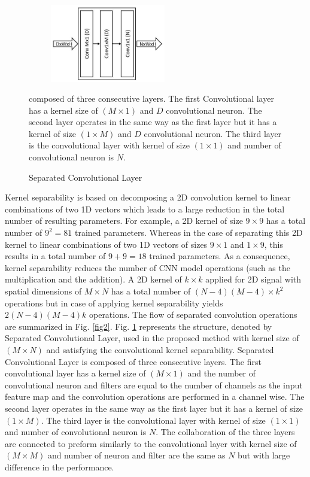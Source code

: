 \begin{figure}
\begin{center}
\includegraphics[height=34mm,width=7.0cm]{Figures/fig3.jpg}
\caption{Separated Convolutional Layer}{ composed of three consecutive layers. The first Convolutional layer has a kernel size of $(M\times1)$ and $D$  convolutional neuron. The second layer  operates in the same way as the first layer but it has a kernel of size $(1\times M)$ and $D$ convolutional neuron. The third layer is the convolutional layer with kernel of size $(1\times1)$ and number of convolutional neuron is $N$.}
\label{fig3}
\end{center}

\end{figure}
    
Kernel separability\cite{rigamonti2013learning} \cite{szegedy2017inception} is based on decomposing a 2D convolution kernel to  linear combinations of two 1D vectors which leads to a large reduction in  the total number of resulting parameters. For example, a 2D kernel of size $9 \times 9$ has a total number of $9^2 = 81$  trained parameters. Whereas in the case of separating this 2D kernel to  linear combinations of two 1D vectors of sizes $9 \times 1$ and $1 \times 9$, this results in a total number of  $9 + 9 = 18$ trained parameters. As a consequence, kernel separability reduces the number of  CNN model operations (such as the multiplication and the addition). A  2D kernel of $k \times k$ applied for 2D signal with spatial dimensions of $ M \times N$ has a total number of  $(N-4)(M-4)\times k^2$ operations but in case of  applying kernel separability  yields $2(N-4)(M-4)k$ operations. The flow of separated convolution operations are summarized in Fig. \ref{fig2}. Fig. \ref{fig3} represents the structure, denoted by Separated Convolutional Layer, used in the proposed method with kernel size of $(M\times N)$ and satisfying the convolutional kernel separability. Separated Convolutional Layer is composed of three consecutive layers. The first convolutional layer has a kernel size of $(M\times1)$ and the number of convolutional neuron and  filters are equal to the number of channels as the input feature map and the convolution operations are performed in a channel wise. The second layer  operates in the same way as the first layer but it has a kernel of size $(1\times M)$. The third layer is the convolutional layer with kernel of size $(1\times1)$ and number of convolutional neuron is $N$. The collaboration of the three layers are  connected to preform similarly to the convolutional layer with kernel size of $(M\times M)$ and number of neuron and filter are the same as $N$ but with large difference in the performance.



